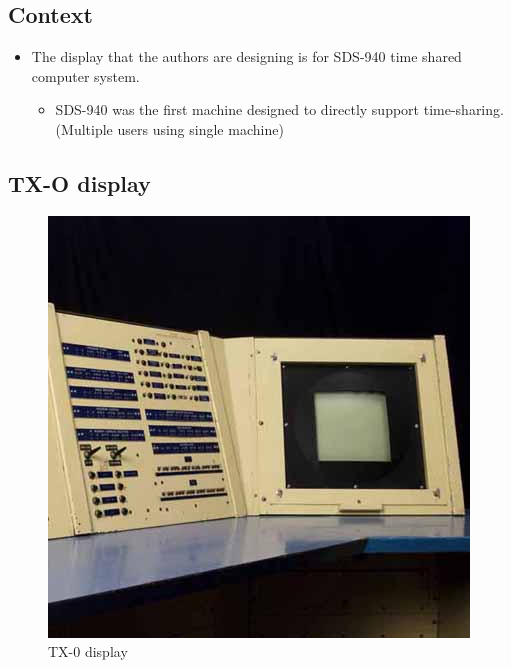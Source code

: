 \documentclass[11pt]{article}
\begin{document}
\subsection{Context}
\label{sec:org040d647}

\begin{itemize}
\item The display that the authors are designing is for SDS-940 time shared 
computer system.

\begin{itemize}
\item SDS-940 was the first machine designed to directly support
time-sharing. (Multiple users using single machine)
\end{itemize}
\end{itemize}


\subsection{TX-O display}
\label{sec:org146292d}

\begin{figure}[htbp]
\centering
\includegraphics[width=.9\linewidth]{./images/TX-0.jpg}
\caption{TX-0 display}
\end{figure}
\end{document}
